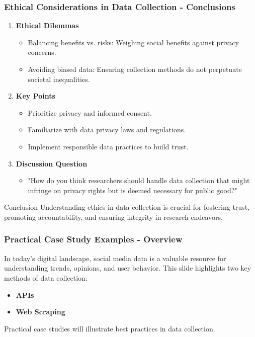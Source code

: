 \documentclass{beamer}
\begin{document}
\begin{frame}[fragile]
    \frametitle{Ethical Considerations in Data Collection - Conclusions}
    \begin{enumerate}
        \item \textbf{Ethical Dilemmas}
            \begin{itemize}
                \item Balancing benefits vs. risks: Weighing social benefits against privacy concerns.
                \item Avoiding biased data: Ensuring collection methods do not perpetuate societal inequalities.
            \end{itemize}
        \item \textbf{Key Points}
            \begin{itemize}
                \item Prioritize privacy and informed consent.
                \item Familiarize with data privacy laws and regulations.
                \item Implement responsible data practices to build trust.
            \end{itemize}
        \item \textbf{Discussion Question}
            \begin{itemize}
                \item "How do you think researchers should handle data collection that might infringe on privacy rights but is deemed necessary for public good?"
            \end{itemize}
    \end{enumerate}

    \begin{block}{Conclusion}
        Understanding ethics in data collection is crucial for fostering trust, promoting accountability, and ensuring integrity in research endeavors.
    \end{block}
\end{frame}

\begin{frame}[fragile]
    \frametitle{Practical Case Study Examples - Overview}
    In today’s digital landscape, social media data is a valuable resource for understanding trends, opinions, and user behavior. This slide highlights two key methods of data collection: 
    \begin{itemize}
        \item \textbf{APIs}
        \item \textbf{Web Scraping}
    \end{itemize}
    Practical case studies will illustrate best practices in data collection.
\end{frame}
\end{document}

